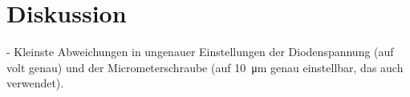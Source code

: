 \section{Diskussion}
\label{sec:Diskussion}

- Kleinste Abweichungen in ungenauer Einstellungen der Diodenspannung (auf volt genau)
und der Micrometerschraube (auf \SI{10}{\micro\meter} genau einstellbar, das auch
verwendet).

